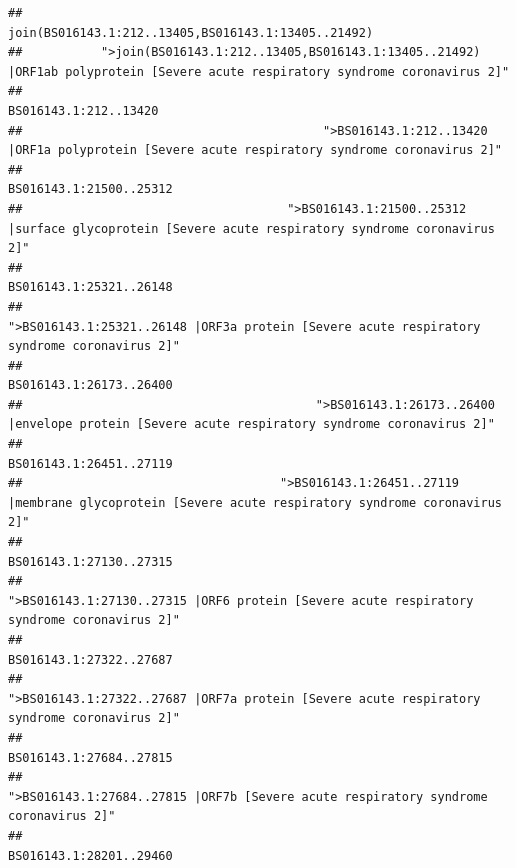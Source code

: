 \documentclass[
]{article}
\begin{document}
\begin{verbatim}
##                                                                                    join(BS016143.1:212..13405,BS016143.1:13405..21492) 
##           ">join(BS016143.1:212..13405,BS016143.1:13405..21492) |ORF1ab polyprotein [Severe acute respiratory syndrome coronavirus 2]" 
##                                                                                                                  BS016143.1:212..13420 
##                                          ">BS016143.1:212..13420 |ORF1a polyprotein [Severe acute respiratory syndrome coronavirus 2]" 
##                                                                                                                BS016143.1:21500..25312 
##                                     ">BS016143.1:21500..25312 |surface glycoprotein [Severe acute respiratory syndrome coronavirus 2]" 
##                                                                                                                BS016143.1:25321..26148 
##                                            ">BS016143.1:25321..26148 |ORF3a protein [Severe acute respiratory syndrome coronavirus 2]" 
##                                                                                                                BS016143.1:26173..26400 
##                                         ">BS016143.1:26173..26400 |envelope protein [Severe acute respiratory syndrome coronavirus 2]" 
##                                                                                                                BS016143.1:26451..27119 
##                                    ">BS016143.1:26451..27119 |membrane glycoprotein [Severe acute respiratory syndrome coronavirus 2]" 
##                                                                                                                BS016143.1:27130..27315 
##                                             ">BS016143.1:27130..27315 |ORF6 protein [Severe acute respiratory syndrome coronavirus 2]" 
##                                                                                                                BS016143.1:27322..27687 
##                                            ">BS016143.1:27322..27687 |ORF7a protein [Severe acute respiratory syndrome coronavirus 2]" 
##                                                                                                                BS016143.1:27684..27815 
##                                                    ">BS016143.1:27684..27815 |ORF7b [Severe acute respiratory syndrome coronavirus 2]" 
##                                                                                                                BS016143.1:28201..29460 

\end{verbatim}
\end{document}
